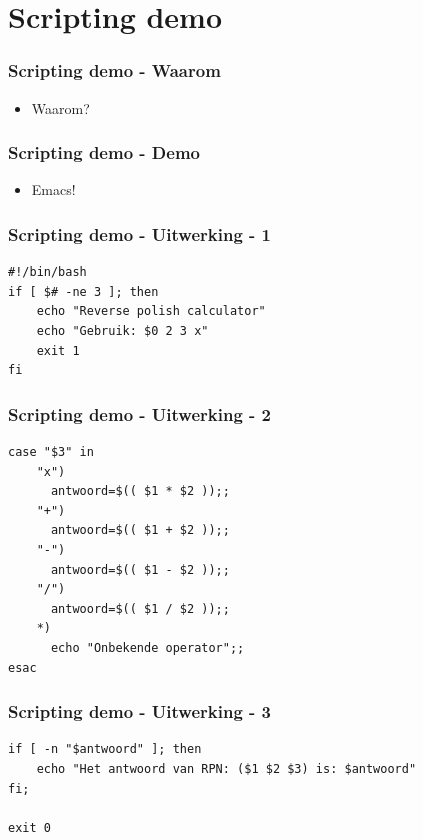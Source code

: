 \documentclass{beamer}
\begin{document}
\section{Scripting demo}

\begin{frame}
  \frametitle{Scripting demo - Waarom}
  \begin{itemize}
    \item<1-> Waarom?
  \end{itemize}
\end{frame}

\begin{frame}
  \frametitle{Scripting demo - Demo}
  \begin{itemize}
    \item<1-> Emacs!
  \end{itemize}
\end{frame}

\begin{frame}[fragile]
  \frametitle{Scripting demo - Uitwerking - 1}
  \begin{lstlisting}
#!/bin/bash
if [ $# -ne 3 ]; then
    echo "Reverse polish calculator"
    echo "Gebruik: $0 2 3 x"
    exit 1
fi

  \end{lstlisting}
\end{frame}

\begin{frame}[fragile]
  \frametitle{Scripting demo - Uitwerking - 2}
  \begin{lstlisting}
case "$3" in 
    "x")
      antwoord=$(( $1 * $2 ));;
    "+")
      antwoord=$(( $1 + $2 ));;
    "-")
      antwoord=$(( $1 - $2 ));;
    "/")
      antwoord=$(( $1 / $2 ));;
    *)
      echo "Onbekende operator";;
esac
  \end{lstlisting}%
\end{frame}

\begin{frame}[fragile]
  \frametitle{Scripting demo - Uitwerking - 3}
  \begin{lstlisting}
if [ -n "$antwoord" ]; then
    echo "Het antwoord van RPN: ($1 $2 $3) is: $antwoord"
fi;

exit 0
  \end{lstlisting}%
\end{frame}
\end{document}
